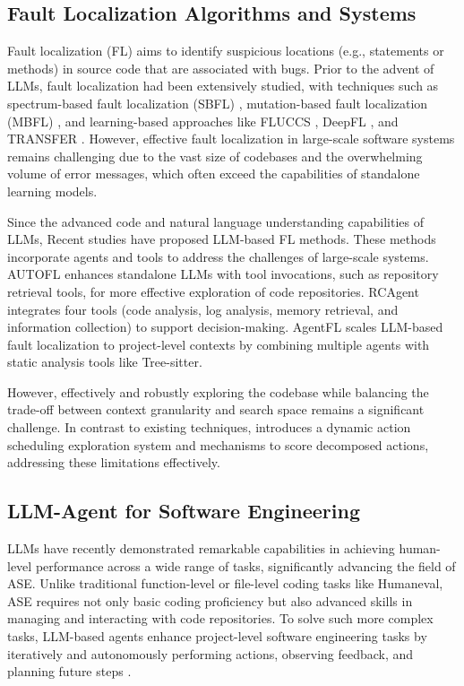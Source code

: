 
\subsection{Fault Localization Algorithms and Systems}
Fault localization (FL) aims to identify suspicious locations (e.g., statements or methods) in source code that are associated with bugs. Prior to the advent of LLMs, fault localization had been extensively studied, with techniques such as spectrum-based fault localization (SBFL) \citep{jones2005empirical}, mutation-based fault localization (MBFL) \citep{papadakis2015metallaxis}, and learning-based approaches like FLUCCS \citep{sohn2017fluccs}, DeepFL \citep{li2019deepfl}, and TRANSFER \citep{meng2022improving}. However, effective fault localization in large-scale software systems remains challenging due to the vast size of codebases and the overwhelming volume of error messages, which often exceed the capabilities of standalone learning models.

Since the advanced code and natural language understanding capabilities of LLMs, Recent studies \citep{yang2024large,wu2023large,li2024enhancing,hossain2024deep,kang2023preliminary,qin2024agentfl,wang2024rcagent} have proposed LLM-based FL methods. These methods incorporate agents and tools to address the challenges of large-scale systems. AUTOFL \citep{kang2023preliminary} enhances standalone LLMs with tool invocations, such as repository retrieval tools, for more effective exploration of code repositories. RCAgent \citep{wang2024rcagent} integrates four tools (code analysis, log analysis, memory retrieval, and information collection) to support decision-making. AgentFL \citep{qin2024agentfl} scales LLM-based fault localization to project-level contexts by combining multiple agents with static analysis tools like Tree-sitter.

However, effectively and robustly exploring the codebase while balancing the trade-off between context granularity and search space remains a significant challenge. In contrast to existing techniques, \nickname introduces a dynamic action scheduling exploration system and mechanisms to score decomposed actions, addressing these limitations effectively.

\subsection{LLM-Agent for Software Engineering}
LLMs have recently demonstrated remarkable capabilities in achieving human-level performance across a wide range of tasks, significantly advancing the field of ASE. Unlike traditional function-level or file-level coding tasks like Humaneval\cite{chen2021evaluating}, ASE requires not only basic coding proficiency but also advanced skills in managing and interacting with code repositories. To solve such more complex tasks, LLM-based agents enhance project-level software engineering tasks by iteratively and autonomously performing actions, observing feedback, and planning future steps \citep{hong2023metagpt,kong2024contrastrepair,wang2024executable,yang2024swe,xia2024agentless,ouyang2024repograph,zhang2024autocoderover}. 

